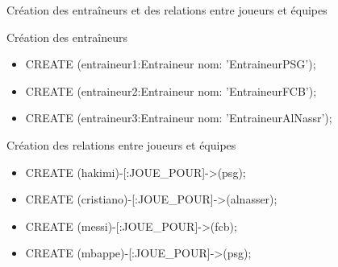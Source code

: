 \begin{frame}{Création des entraîneurs et des relations entre joueurs et équipes}
  \begin{block}{Création des entraîneurs}
    \begin{itemize}
      \item CREATE (entraineur1:Entraineur {nom: 'EntraineurPSG'});
      \item CREATE (entraineur2:Entraineur {nom: 'EntraineurFCB'});
      \item CREATE (entraineur3:Entraineur {nom: 'EntraineurAlNassr'});
    \end{itemize}
  \end{block}

  \begin{block}{Création des relations entre joueurs et équipes}
    \begin{itemize}
      \item CREATE (hakimi)-[:JOUE\_POUR]->(psg);
      \item CREATE (cristiano)-[:JOUE\_POUR]->(alnasser);
      \item CREATE (messi)-[:JOUE\_POUR]->(fcb);
      \item CREATE (mbappe)-[:JOUE\_POUR]->(psg);
    \end{itemize}
  \end{block}
\end{frame}